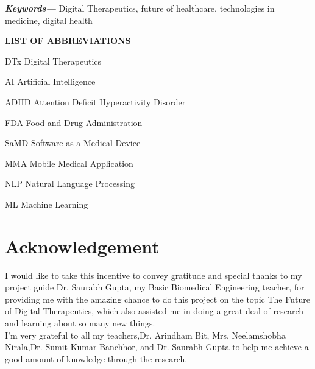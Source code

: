 \documentclass[15pt]{article}
\begin{document}
\pagestyle{fancy}
\tableofcontents
\vspace{2cm}
\providecommand{\keywords}[1]
{
  \small	
  \textbf{\textit{Keywords---}} #1
}

\keywords {Digital Therapeutics, future of healthcare, technologies in medicine, digital health} \vspace{2cm}
 



\begin{center}
    \textbf{LIST OF ABBREVIATIONS} \vspace{0.5cm}
\begin{abbrv}

\item[DTx]			Digital Therapeutics
\item[AI]			Artificial Intelligence
\item[ADHD]			Attention Deficit Hyperactivity Disorder
\item[FDA]			Food and Drug Administration
\item[SaMD]			Software as a Medical Device
\item[MMA]			Mobile Medical Application 
\item[NLP]			Natural Language Processing
\item[ML]			Machine Learning

\end{abbrv}
\end{center}


\pagebreak

\section*{Acknowledgement} \vspace{0.5cm}
I would like to take this incentive to convey gratitude and special thanks to my project guide Dr. Saurabh Gupta, my Basic Biomedical Engineering teacher, for providing me with the amazing chance to do this project on the topic The Future of Digital Therapeutics, which also assisted me in doing a great deal of research and learning about so many new things.\\

I'm very grateful to all my teachers,Dr. Arindham Bit, Mrs. Neelamshobha Nirala,Dr. Sumit Kumar Banchhor, and Dr. Saurabh Gupta to help me achieve a good amount of knowledge through the research.\\
\end{document}
